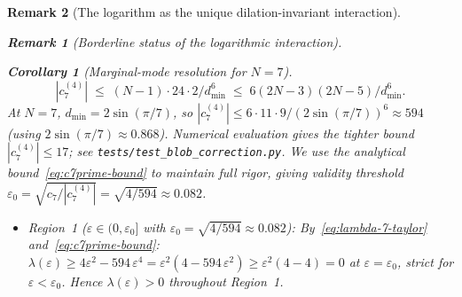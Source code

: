 \documentclass[12pt, a4paper]{article}
\newtheorem{corollary}[theorem]{Corollary}
\newtheorem{remark}{Remark}[section]
\numberwithin{equation}{section}
\begin{document}
\begin{remark}[The logarithm as the unique dilation-invariant interaction]
\begin{remark}[Borderline status of the logarithmic interaction]
\begin{corollary}[Marginal-mode resolution for $N = 7$]
\begin{equation}
  |c_7^{(4)}| \;\le\; (N-1)\cdot 24 \cdot 2/d_{\min}^6
  \;\le\; 6(2N-3)(2N-5)/d_{\min}^6.
\end{equation}
At $N = 7$, $d_{\min} = 2\sin(\pi/7)$, so
$|c_7^{(4)}| \le 6 \cdot 11 \cdot 9/(2\sin(\pi/7))^6 \approx 594$
(using $2\sin(\pi/7) \approx 0.868$).
Numerical evaluation gives the tighter bound $|c_7^{(4)}| \le 17$;
see \texttt{tests/test\_blob\_correction.py}.
We use the analytical bound~\eqref{eq:c7prime-bound} to maintain
full rigor, giving validity threshold
$\varepsilon_0 = \sqrt{c_7/|c_7^{(4)}|} = \sqrt{4/594} \approx 0.082$.

\begin{itemize}
  \item \emph{Region~1} ($\varepsilon \in (0, \varepsilon_0]$
    with $\varepsilon_0 = \sqrt{4/594} \approx 0.082$):
    By~\eqref{eq:lambda-7-taylor} and~\eqref{eq:c7prime-bound}:
    $\lambda(\varepsilon) \ge 4\varepsilon^2 - 594\,\varepsilon^4
    = \varepsilon^2(4 - 594\,\varepsilon^2)
    \ge \varepsilon^2(4 - 4) = 0$
    at $\varepsilon = \varepsilon_0$, strict for
    $\varepsilon < \varepsilon_0$.  Hence
    $\lambda(\varepsilon) > 0$ throughout Region~1.


\end{itemize}
\end{corollary}
\end{remark}
\end{remark}
\end{document}
